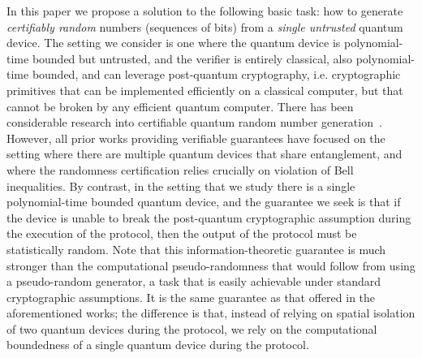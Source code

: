 \documentclass[11pt]{article}
\theoremstyle{remark}
\theoremstyle{definition}
\begin{document}
In this paper we propose a solution to the following basic task: how to generate \emph{certifiably random} numbers (sequences of bits) from a \emph{single untrusted} quantum device. The setting we consider is one where the quantum device is polynomial-time bounded but untrusted, and the verifier is entirely classical, also polynomial-time bounded, and can leverage post-quantum cryptography, i.e. cryptographic primitives that can be implemented efficiently on a classical computer, but that cannot be broken by any efficient quantum computer. 
There has been considerable research into certifiable quantum random number generation~\cite{Colbeck09,Pironio,FGS11,PM11,VV12,miller2016robust,bierhorst2018experimentally}. However, all prior works providing verifiable guarantees have focused on the setting where there are multiple quantum devices
that share entanglement, and where the randomness certification relies crucially on violation of Bell inequalities. By contrast, in the setting that we study there is a single polynomial-time bounded quantum device, and the guarantee we seek is that if the device is unable to break the post-quantum cryptographic assumption during the execution of the protocol, then the output 
of the protocol must be statistically random. Note that this information-theoretic guarantee is much stronger than the computational pseudo-randomness that would follow from using a pseudo-random generator, a task that is easily achievable under standard cryptographic assumptions. It is the same guarantee as that offered in the aforementioned works; the difference is that, instead of relying on spatial isolation of two quantum devices during the protocol, we rely on the computational boundedness of a single quantum device during the protocol. 
\end{document}
